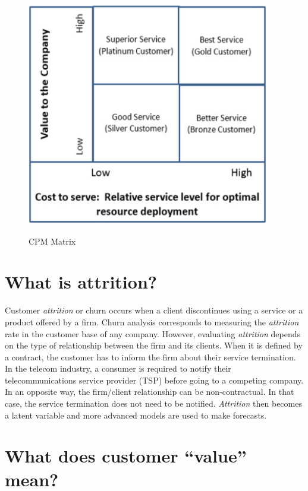 \documentclass[
]{book}
\begin{document}
\begin{figure}

{\centering \includegraphics[width=300pt,height=300pt]{./imgs/cpm_matrix} 

}

\caption{CPM Matrix}\label{fig:cpmmat}
\end{figure}

\hypertarget{what-is-attrition}{%
\section{What is attrition?}\label{what-is-attrition}}

Customer \emph{attrition} or churn occurs when a client discontinues using a service or a product offered by a firm. Churn analysis corresponds to measuring the \emph{attrition} rate in the customer base of any company. However, evaluating \emph{attrition} depends on the type of relationship between the firm and its clients. When it is defined by a contract, the customer has to inform the firm about their service termination. In the telecom industry, a consumer is required to notify their telecommunications service provider (TSP) before going to a competing company. In an opposite way, the firm/client relationship can be non-contractual. In that case, the service termination does not need to be notified. \emph{Attrition} then becomes a latent variable and more advanced models are used to make forecasts.

\hypertarget{what-does-customer-value-mean}{%
\section{What does customer ``value'' mean?}\label{what-does-customer-value-mean}}
\end{document}
